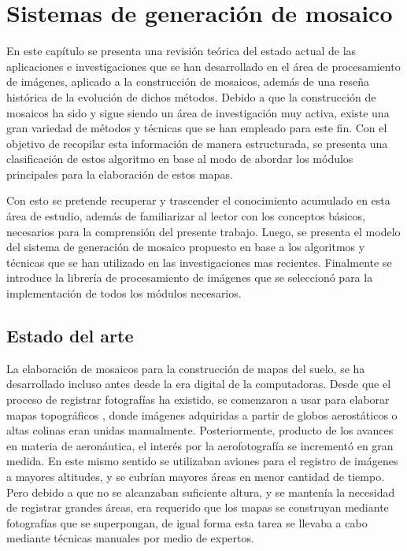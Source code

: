 \chapter{Sistemas de generación de mosaico}
\label{capitulo2}

En este capítulo se presenta una revisión teórica del estado actual de las aplicaciones e investigaciones que se han desarrollado en el área de procesamiento de imágenes, aplicado a la construcción de mosaicos, además de una reseña histórica de la evolución de dichos métodos. Debido a que la construcción de mosaicos ha sido y sigue siendo un área de investigación muy activa, existe una gran variedad de métodos y técnicas que se han empleado para este fin. Con el objetivo de recopilar esta información de manera estructurada, se presenta una clasificación de estos algoritmo en base al modo de abordar los módulos principales para la elaboración de estos mapas.

Con esto se pretende recuperar y trascender el conocimiento acumulado en esta área de estudio, además de familiarizar al lector con los conceptos básicos, necesarios para la comprensión del presente trabajo. Luego, se presenta el modelo del sistema de generación de mosaico propuesto en base a los algoritmos y técnicas que se han utilizado en las investigaciones mas recientes. Finalmente se introduce la librería de procesamiento de imágenes que se seleccionó para la implementación de todos los módulos necesarios.

\section{Estado del arte}

La elaboración de mosaicos para la construcción de mapas del suelo, se ha desarrollado incluso antes desde la era digital de la computadoras. Desde que el proceso de registrar fotografías ha existido, se comenzaron a usar para elaborar mapas topográficos \cite{primeros-mapas}, donde imágenes adquiridas a partir de globos aerostáticos o altas colinas eran unidas manualmente. Posteriormente, producto de los avances en materia de aeronáutica, el interés por la aerofotografía se incrementó en gran medida. En este mismo sentido se utilizaban aviones para el registro de imágenes a mayores altitudes, y se cubrían mayores áreas en menor cantidad de tiempo. Pero debido a que no se alcanzaban suficiente altura, y se mantenía la necesidad de registrar grandes áreas, era requerido que los mapas se construyan mediante fotografías que se superpongan, de igual forma esta tarea se llevaba a cabo mediante técnicas manuales por medio de expertos.

